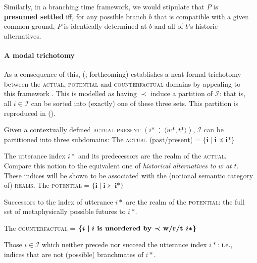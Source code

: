 \documentclass[12pt,dvipsnames]{report}
\begin{document}
\xe

\noindent Similarly, in a branching time framework, we would stipulate that $ P $ is \textbf{presumed settled} iff, for any possible branch $ b $ that is compatible with a given common ground, $ P $ is identically determined at $ b $ and all of $ b $'s historic alternatives.



\paragraph{A modal trichotomy}\label{vP-trich} As a consequence of this,  \citeauthor{VonPrince2017a} (\citeyear{VonPrince2017a,VonPrince2019}; \citealp{VonPrincea} forthcoming) establishes a neat formal trichotomy between the \textsc{actual, potential} and \textsc{counterfactual} domains by appealing to this framework \citetext{\citealp[see also][41]{Rumberg2016a}, \citeyear{Rumberg2019}}. This is modelled as having $ \boldsymbol{\prec} $ induce a partition of $ \mathcal I $: that is, all $ i\in\mathcal I $ can be sorted into (exactly) one of these three sets. This partition is reproduced in ().

\pex Given a contextually defined \textsc{actual present} $( i*\doteqdot\langle w*,t*\rangle )$, $ \mathcal I $ can be partitioned into three subdomains:
\a The \textsc{actual} (past/present) = $\boldsymbol{ \{i\mid i\preccurlyeq i*\} }$

The utterance index $ i* $ and its predecessors are the realm of the \textsc{actual}.
Compare this notion to the equivalent one of \textit{historical alternatives to $ w $ at $ t $}. These indices will be shown to be associated with the (notional semantic category of) \textsc{realis}.
\a The \textsc{potential} = $ \boldsymbol{\{i\mid i\succ i*\} }$

Successors to the index of utterance $ i* $ are the realm of the \textsc{potential}: the full set of metaphysically possible futures to $ i* $.

\a The \textsc{counterfactual} = $\boldsymbol{ \{i\mid i \textbf{ is unordered by $ \boldsymbol\prec $ w/r/t } i* \}}$

Those $ i\in\mathcal I $ which neither precede nor succeed the utterance index $ i* $: i.e., indices that are not (possible) branchmates of $ i* $.
\end{document}
